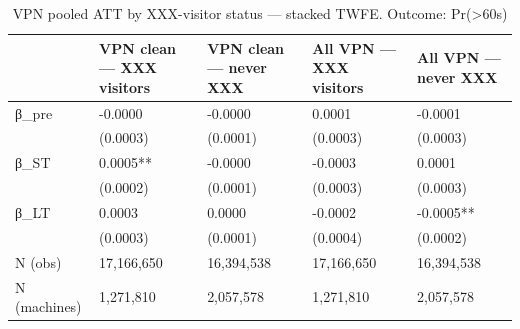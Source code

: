 \begin{table}

\caption{VPN pooled ATT by XXX-visitor status — stacked TWFE. Outcome: Pr(>60s)}
\centering
\begin{tabular}[t]{lllll}
\toprule
  & VPN clean — XXX visitors & VPN clean — never XXX & All VPN — XXX visitors & All VPN — never XXX\\
\midrule
β\_pre & -0.0000 & -0.0000 & 0.0001 & -0.0001\\
 & (0.0003) & (0.0001) & (0.0003) & (0.0003)\\
β\_ST & 0.0005** & -0.0000 & -0.0003 & 0.0001\\
 & (0.0002) & (0.0001) & (0.0003) & (0.0003)\\
β\_LT & 0.0003 & 0.0000 & -0.0002 & -0.0005**\\
\addlinespace
 & (0.0003) & (0.0001) & (0.0004) & (0.0002)\\
N (obs) & 17,166,650 & 16,394,538 & 17,166,650 & 16,394,538\\
N (machines) & 1,271,810 & 2,057,578 & 1,271,810 & 2,057,578\\
\bottomrule
\end{tabular}
\end{table}
